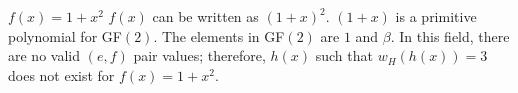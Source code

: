  \begin{example}
 $f(x)=1+x^2$ \newline $f(x)$ can be written as $(1+x)^2$. $(1+x)$ is a primitive polynomial for GF$(2)$. The elements in GF$(2)$ are $1$ and $\beta$. In this field,  there are no valid $(e,f)$ pair values; therefore, $h(x)$ such that  $w_H(h(x))=3$ does not exist for $f(x)=1+x^2$.
 \end{example}
 
 
 


